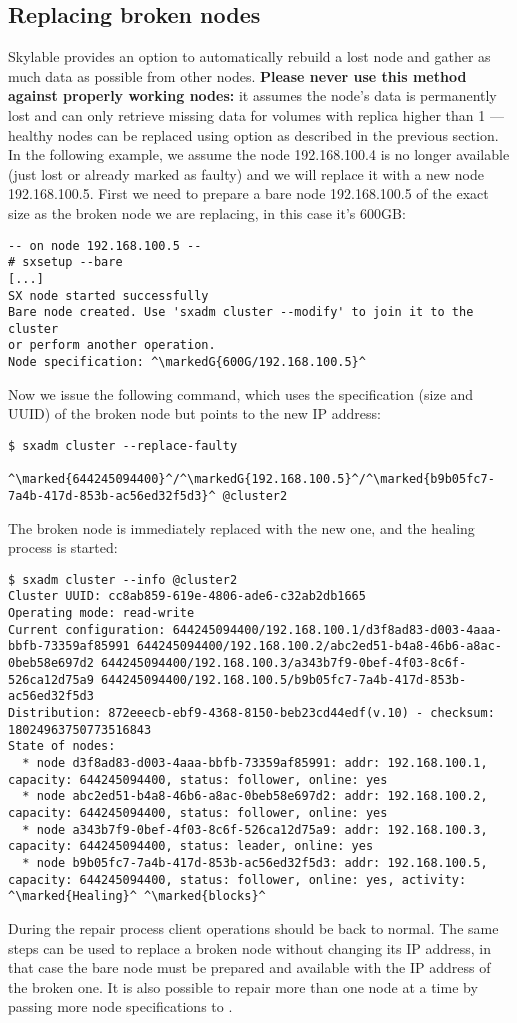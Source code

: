\subsection{Replacing broken nodes}
Skylable \SX provides an option to automatically rebuild
a lost node and gather as much data as possible from other nodes.
\textbf{Please never use this method against properly working nodes:} it
assumes the node's data is permanently lost and can only retrieve missing data
for volumes with replica higher than 1 --- healthy nodes can be replaced using
 option as described in the previous section. In the following
example, we assume the node 192.168.100.4 is no longer available (just lost
or already marked as faulty) and we will replace it with a new node 192.168.100.5.
First we need to prepare a bare node 192.168.100.5 of the exact size as the broken
node we are replacing, in this case it's 600GB:
\begin{lstlisting}
-- on node 192.168.100.5 --
# sxsetup --bare
[...]
SX node started successfully
Bare node created. Use 'sxadm cluster --modify' to join it to the cluster
or perform another operation.
Node specification: ^\markedG{600G/192.168.100.5}^
\end{lstlisting}
Now we issue the following command, which uses the specification (size and UUID)
of the broken node but points to the new IP address:
\begin{lstlisting}
$ sxadm cluster --replace-faulty
    ^\marked{644245094400}^/^\markedG{192.168.100.5}^/^\marked{b9b05fc7-7a4b-417d-853b-ac56ed32f5d3}^ @cluster2
\end{lstlisting}
The broken node is immediately replaced with the new one, and the healing process
is started:
\begin{lstlisting}
$ sxadm cluster --info @cluster2
Cluster UUID: cc8ab859-619e-4806-ade6-c32ab2db1665
Operating mode: read-write
Current configuration: 644245094400/192.168.100.1/d3f8ad83-d003-4aaa-bbfb-73359af85991 644245094400/192.168.100.2/abc2ed51-b4a8-46b6-a8ac-0beb58e697d2 644245094400/192.168.100.3/a343b7f9-0bef-4f03-8c6f-526ca12d75a9 644245094400/192.168.100.5/b9b05fc7-7a4b-417d-853b-ac56ed32f5d3 
Distribution: 872eeecb-ebf9-4368-8150-beb23cd44edf(v.10) - checksum: 18024963750773516843
State of nodes:
  * node d3f8ad83-d003-4aaa-bbfb-73359af85991: addr: 192.168.100.1, capacity: 644245094400, status: follower, online: yes
  * node abc2ed51-b4a8-46b6-a8ac-0beb58e697d2: addr: 192.168.100.2, capacity: 644245094400, status: follower, online: yes
  * node a343b7f9-0bef-4f03-8c6f-526ca12d75a9: addr: 192.168.100.3, capacity: 644245094400, status: leader, online: yes
  * node b9b05fc7-7a4b-417d-853b-ac56ed32f5d3: addr: 192.168.100.5, capacity: 644245094400, status: follower, online: yes, activity: ^\marked{Healing}^ ^\marked{blocks}^
\end{lstlisting}
During the repair process client operations should be back to normal. The same
steps can be used to replace a broken node without changing its IP address, in
that case the bare node must be prepared and available with the IP address of
the broken one. It is also possible to repair more than one node at a time by
passing more node specifications to .

